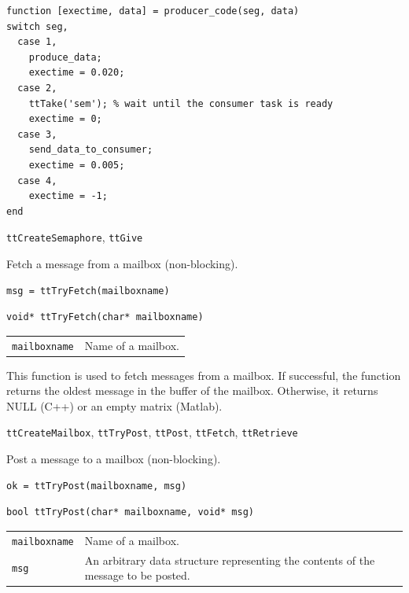 \documentclass[final,twoside]{rapport}
\begin{document}
\begin{small}
\begin{verbatim}
function [exectime, data] = producer_code(seg, data)
switch seg,
  case 1,
    produce_data;
    exectime = 0.020;
  case 2, 
    ttTake('sem'); % wait until the consumer task is ready
    exectime = 0;
  case 3,
    send_data_to_consumer;
    exectime = 0.005;
  case 4,
    exectime = -1;
end
\end{verbatim}
\end{small}

\seealso
{\tt ttCreateSemaphore}, {\tt ttGive}



\purpose
Fetch a message from a mailbox (non-blocking). 

\Msyntax
\begin{verbatim}
msg = ttTryFetch(mailboxname)
\end{verbatim}

\Csyntax
\begin{verbatim}
void* ttTryFetch(char* mailboxname)
\end{verbatim}

\args
\begin{tabularx}{\hsize}{l>{\raggedright\arraybackslash}X}
  {\tt mailboxname} & Name of a mailbox.
\end{tabularx}

\descr This function is used to fetch messages from a mailbox. If
successful, the function returns the oldest message in the buffer of
the mailbox. Otherwise, it returns NULL (C++) or an empty matrix
(Matlab).

\seealso
{\tt ttCreateMailbox}, {\tt ttTryPost}, {\tt ttPost},
{\tt ttFetch}, {\tt ttRetrieve}



\purpose
Post a message to a mailbox (non-blocking).

\Msyntax
\begin{verbatim}
ok = ttTryPost(mailboxname, msg)
\end{verbatim}

\Csyntax
\begin{verbatim}
bool ttTryPost(char* mailboxname, void* msg)
\end{verbatim}

\args
\begin{tabularx}{\hsize}{l>{\raggedright\arraybackslash}X}
  {\tt mailboxname} & Name of a mailbox. \\
  {\tt msg} & An arbitrary data structure representing the contents
  of the message to be posted.
\end{tabularx}
\end{document}
